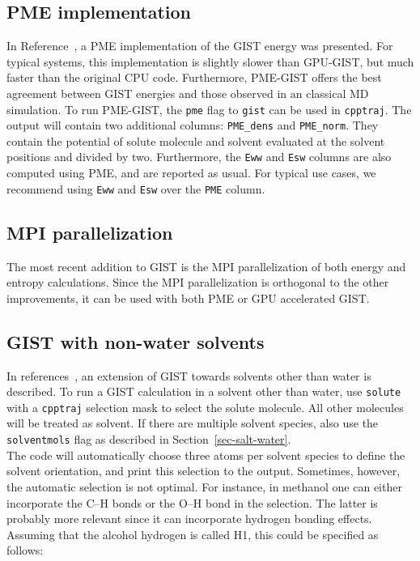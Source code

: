 \documentclass[9pt,tutorial]{livecoms}
\newcommand{\software}{\texttt}
\newcommand\inlinecode{\texttt}
\begin{document}
\subsection{PME implementation}
In Reference~\cite{Chen2021}, a PME implementation of the GIST energy was presented.
For typical systems, this implementation is slightly slower than GPU-GIST, but much faster than the original CPU code.
Furthermore, PME-GIST offers the best agreement between GIST energies and those observed in an classical MD simulation.
To run PME-GIST, the \inlinecode{pme} flag to \inlinecode{gist} can be used in \software{cpptraj}.
The output will contain two additional columns: \inlinecode{PME\_dens} and \inlinecode{PME\_norm}.
They contain the potential of solute molecule and solvent evaluated at the solvent positions and divided by two.
Furthermore, the \inlinecode{Eww} and \inlinecode{Esw} columns are also computed using PME, and are reported as usual.
For typical use cases, we recommend using \inlinecode{Eww} and \inlinecode{Esw} over the \inlinecode{PME} column.

\subsection{MPI parallelization}
The most recent addition to GIST is the MPI parallelization of both energy and entropy calculations\cite{Roe2023-mpi-gist}.
Since the MPI parallelization is orthogonal to the other improvements, it can be used with both PME or GPU accelerated GIST.
\subsection{GIST with non-water solvents}
In references~\cite{Kraml2020,Kamenik2020-gist-macrocycles,Waibl2022-gist-solvents}, an extension of GIST towards solvents other than water is described.
To run a GIST calculation in a solvent other than water, use \inlinecode{solute} with a \software{cpptraj} selection mask to select the solute molecule.
All other molecules will be treated as solvent.
If there are multiple solvent species, also use the \inlinecode{solventmols} flag as described in Section~\ref{sec-salt-water}. \\
The code will automatically choose three atoms per solvent species to define the solvent orientation, and print this selection to the output.
Sometimes, however, the automatic selection is not optimal.
For instance, in methanol one can either incorporate the C--H bonds or the O--H bond in the selection.
The latter is probably more relevant since it can incorporate hydrogen bonding effects.
Assuming that the alcohol hydrogen is called H1, this could be specified as follows:
\end{document}
